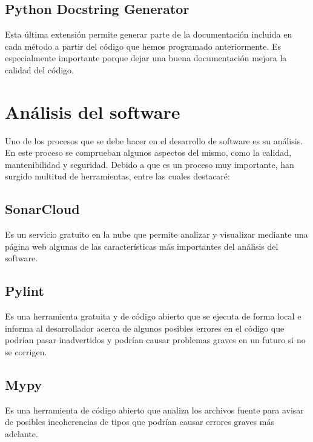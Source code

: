 \subsection{Python Docstring Generator}
Esta última extensión permite generar parte de la documentación incluida en cada método a partir del código que hemos programado anteriormente. Es especialmente importante porque dejar una buena documentación mejora la calidad del código.

\section{Análisis del software}
Uno de los procesos que se debe hacer en el desarrollo de software es su análisis. En este proceso se comprueban algunos aspectos del mismo, como la calidad, mantenibilidad y seguridad. Debido a que es un proceso muy importante, han surgido multitud de herramientas, entre las cuales destacaré:
\subsection{SonarCloud}
Es un servicio gratuito en la nube que permite analizar y visualizar mediante una página web algunas de las características más importantes del análisis del software.
\subsection{Pylint}
Es una herramienta gratuita y de código abierto que se ejecuta de forma local e informa al desarrollador acerca de algunos posibles errores en el código que podrían pasar inadvertidos y podrían causar problemas graves en un futuro si no se corrigen.
\subsection{Mypy}
Es una herramienta de código abierto que analiza los archivos fuente para avisar de posibles incoherencias de tipos que podrían causar errores graves más adelante.